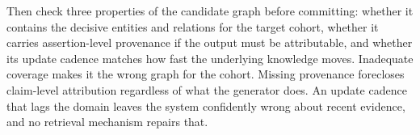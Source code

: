Then check three properties of the candidate graph before committing: whether it contains the decisive entities and relations for the target cohort, whether it carries assertion-level provenance if the output must be attributable, and whether its update cadence matches how fast the underlying knowledge moves. Inadequate coverage makes it the wrong graph for the cohort. Missing provenance forecloses claim-level attribution regardless of what the generator does. An update cadence that lags the domain leaves the system confidently wrong about recent evidence, and no retrieval mechanism repairs that.
